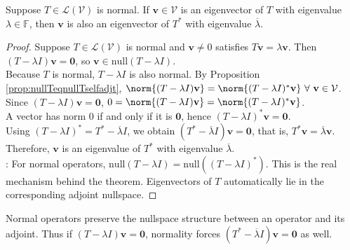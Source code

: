 \begin{corollary} \label{cor:sameeigenadjtandnormal} Suppose $T \in \mathcal{L}(\mathcal{V})$ is normal. If $\mathbf{v} \in \mathcal{V}$ is an eigenvector of $T$ with eigenvalue $\lambda \in \mathbb{F}$, then $\mathbf{v}$ is also an eigenvector of $T^*$ with eigenvalue $\overline{\lambda}$.
\begin{proof} Suppose $T \in \mathcal{L}(\mathcal{V})$ is normal and $\mathbf{v} \neq 0$ satisfies $T \mathbf{v} = \lambda \mathbf{v}$. Then $(T - \lambda I) \mathbf{v} = \mathbf{0}$, so $\mathbf{v} \in \text{null}(T - \lambda I)$.\\
Because $T$ is normal, $T - \lambda I$ is also normal. By Proposition \ref{prop:nullTeqnullTselfadjt}, $\norm{(T - \lambda I)\mathbf{v}} = \norm{(T - \lambda I)^* \mathbf{v}} \ \forall \ \mathbf{v} \in \mathcal{V}$.\\
Since $(T - \lambda I) \mathbf{v} = \mathbf{0}$, $0 = \norm{(T - \lambda I)\mathbf{v}} = \norm{(T - \lambda I)^* \mathbf{v}}$.\\
A vector has norm $0$ if and only if it is $\mathbf{0}$, hence $(T - \lambda I)^* \mathbf{v} = \mathbf{0}$.\\
Using $(T - \lambda I)^* = T^* - \overline{\lambda}I$, we obtain $(T^* - \overline{\lambda}I)\mathbf{v} = \mathbf{0}$, that is, $T^* \mathbf{v} = \overline{\lambda}\mathbf{v}$.\\
Therefore, $\mathbf{v}$ is an eigenvalue of $T^*$ with eigenvalue $\overline{\lambda}$.\\
: For normal operators, $\text{null}(T - \lambda I) = \text{null}((T - \lambda I)^*)$. This is the real mechanism behind the theorem. Eigenvectors of $T$ automatically lie in the corresponding adjoint nullspace.
\end{proof}
\end{corollary}

Normal operators preserve the nullspace structure between an operator and its adjoint. Thus if $(T - \lambda I)\mathbf{v} = \mathbf{0}$, normality forces $(T^* - \overline{\lambda}I)\mathbf{v} = \mathbf{0}$ as well.

